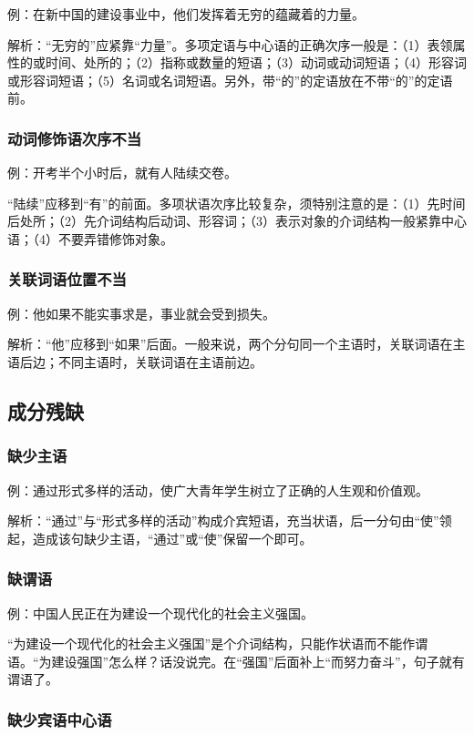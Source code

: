 例：在新中国的建设事业中，他们发挥着无穷的蕴藏着的力量。

解析：“无穷的”应紧靠“力量”。多项定语与中心语的正确次序一般是：（1）表领属性的或时间、处所的；（2）指称或数量的短语；（3）动词或动词短语；（4）形容词或形容词短语；（5）名词或名词短语。另外，带“的”的定语放在不带“的”的定语前。

\subsubsection{动词修饰语次序不当}

例：开考半个小时后，就有人陆续交卷。

“陆续”应移到“有”的前面。多项状语次序比较复杂，须特别注意的是：（1）先时间后处所；（2）先介词结构后动词、形容词；（3）表示对象的介词结构一般紧靠中心语；（4）不要弄错修饰对象。

\subsubsection{关联词语位置不当}

例：他如果不能实事求是，事业就会受到损失。

解析：“他”应移到“如果”后面。一般来说，两个分句同一个主语时，关联词语在主语后边；不同主语时，关联词语在主语前边。

\subsection{成分残缺}

\subsubsection{缺少主语}

例：通过形式多样的活动，使广大青年学生树立了正确的人生观和价值观。

解析：“通过”与“形式多样的活动”构成介宾短语，充当状语，后一分句由“使”领起，造成该句缺少主语，“通过”或“使”保留一个即可。

\subsubsection*{缺谓语}

例：中国人民正在为建设一个现代化的社会主义强国。

“为建设一个现代化的社会主义强国”是个介词结构，只能作状语而不能作谓语。“为建设强国”怎么样？话没说完。在“强国”后面补上“而努力奋斗”，句子就有谓语了。

\subsubsection{缺少宾语中心语}

